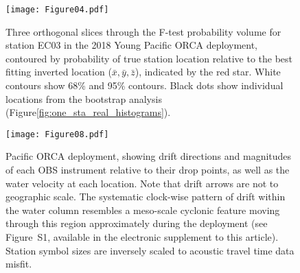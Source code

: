 \documentclass[10pt,titlepage]{article}
\providecommand{\DIFaddtex}[1]{{\protect\color{blue}\uwave{#1}}} %
\providecommand{\DIFaddFL}[1]{\DIFadd{#1}} %
\providecommand{\DIFaddbeginFL}{} %
\providecommand{\DIFaddendFL}{} %
\providecommand{\DIFadd}[1]{\texorpdfstring{\DIFaddtex{#1}}{#1}} %
\begin{document}
\begin{figure}
[h]
\texttt{[image: Figure04.pdf]}
\caption{ Three orthogonal slices through the F-test probability volume for station EC03 in the 2018 Young Pacific ORCA deployment, contoured by probability of true station location relative to the best fitting inverted location ($\bar{x},\bar{y},\bar{z}$), indicated by the red star. White contours show 68\% and 95\% contours. Black dots show individual locations from the bootstrap analysis (Figure\DIFaddbeginFL \DIFaddFL{~}\DIFaddendFL \ref{fig:one_sta_real_histograms}).}
\label{fig:one_sta_real_ftests}
\end{figure}
\newpage

\begin{figure}
[h]
\texttt{[image: Figure08.pdf]}
\caption{Pacific ORCA deployment, showing drift directions and magnitudes of each OBS instrument relative to their drop points, as well as the water velocity at each location. Note that drift arrows are not to geographic scale. The systematic clock-wise pattern of drift within the water column resembles a meso-scale cyclonic feature moving through this region approximately during the deployment (see Figure~S1, available in the electronic supplement to this article). Station symbol sizes are inversely scaled to acoustic travel time data misfit.}
\label{fig:meso_eddy}
\end{figure}
\newpage
\renewcommand{\arraystretch}{1.4}
\end{document}
